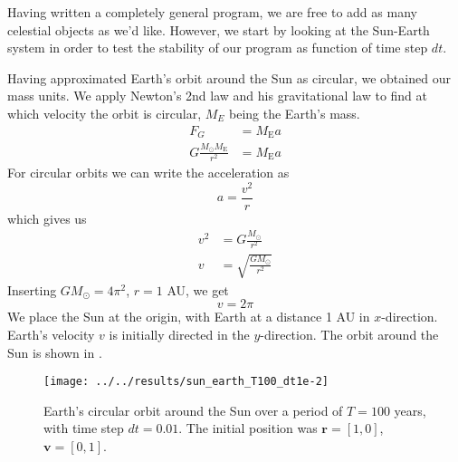 
Having written a completely general program, we are free to add as many
celestial objects as we'd like. However, we start by looking at the Sun-Earth
system in order to test the stability of our program as function of time step
$dt$.

Having approximated Earth's orbit around the Sun as circular, we obtained our
mass units. We apply Newton's 2nd law and his gravitational law to find at which
velocity the orbit is circular, $M_E$ being the Earth's mass.
%
\begin{align*}
	F_G &= M_{\text{E}}a \\
	G \frac{M_{\odot}M_{\text{E}}}{r^2} &= M_{\text{E}}a
\end{align*}
%
For circular orbits we can write the acceleration as
%
\begin{equation*}
	a = \frac{v^2}{r}
\end{equation*}
which gives us
%
\begin{align*}
	v^2 &= G \frac{M_{\odot}}{r^2} \\
	v &= \sqrt{ \frac{GM_{\odot}}{r^2}}
\end{align*}
%
Inserting $GM_{\odot} = 4\pi^2$, $r = 1$ AU, we get
%
\begin{equation*}
	v = 2\pi
\end{equation*}
%
We place the Sun at the origin, with Earth at a distance 1 AU in $x$-direction.
Earth's velocity $v$ is initially directed in the $y$-direction. The orbit
around the Sun is shown in .
%
\begin{figure}[htpb]
	\centering
	\texttt{[image: ../../results/sun\_earth\_T100\_dt1e-2]}
	\caption{Earth's circular orbit around the Sun over a period of $T = 100$
		years, with time step $dt = 0.01$. The initial position was
		$\mathbf{r} = [1,0]$, $\mathbf{v} = [0,1]$.}
	\label{fig:sunEarth-dt0.01}
\end{figure}
%

